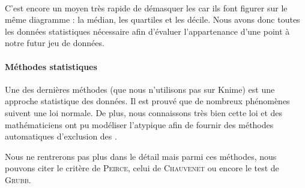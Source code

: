 \paragraph{}
C'est encore un moyen très rapide de démasquer les  car ils font figurer sur le même diagramme : la médian, les quartiles et les décile. Nous avons donc toutes les données statistiques nécessaire afin d'évaluer l'appartenance d'une point à notre futur jeu de données.

\paragraph{Méthodes statistiques}
Une des dernières méthodes (que nous n'utilisons pas sur Knime) est une approche statistique des données. Il est prouvé que de nombreux phénomènes suivent une loi normale. De plus, nous connaissons très bien cette loi et des mathématiciens ont pu modéliser l'atypique afin de fournir des méthodes automatiques d'exclusion des . 

Nous ne rentrerons pas plus dans le détail mais parmi ces méthodes, nous pouvons citer le critère de \textsc{Peirce}, celui de \textsc{Chauvenet} ou encore le test de \textsc{Grubb}.
